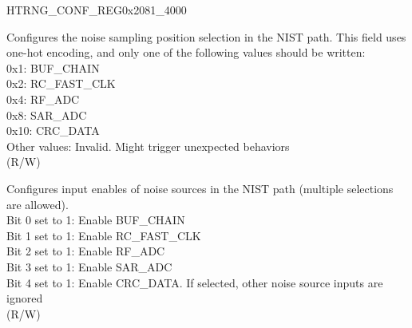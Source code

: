 \addtocounter{Regfloat}{-1}
\begin{register}{H}{TRNG\_CONF\_REG}{0x2081\_4000}
\begin{regdesc}\begin{reglist}
\item [Continued from the previous page...]

\label{fielddesc:TRNGNOISEPOSSEL}\item [TRNG\_NOISE\_POS\_SEL] Configures the noise sampling position selection in the NIST path. This field uses one-hot encoding, and only one of the following values should be written:\\
0x1: BUF\_CHAIN\\
0x2: RC\_FAST\_CLK\\
0x4: RF\_ADC\\
0x8: SAR\_ADC\\
0x10: CRC\_DATA\\
Other values: Invalid. Might trigger unexpected behaviors\\
(R/W)


\label{fielddesc:TRNGNOISESOURCESEL}\item [TRNG\_NOISE\_SOURCE\_SEL] Configures input enables of noise sources in the NIST path (multiple selections are allowed).\\
Bit 0 set to 1: Enable BUF\_CHAIN\\
Bit 1 set to 1: Enable RC\_FAST\_CLK\\
Bit 2 set to 1: Enable RF\_ADC\\
Bit 3 set to 1: Enable SAR\_ADC\\
Bit 4 set to 1: Enable CRC\_DATA. If selected, other noise source inputs are ignored\\
(R/W)
\end{reglist}\end{regdesc}
\end{register}


